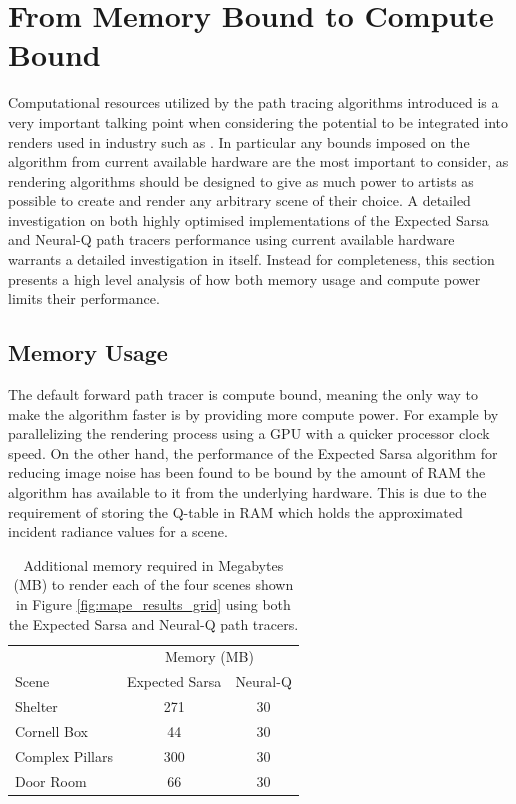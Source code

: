 \documentclass[../dissertation.tex]{subfiles}
\begin{document}
\section{From Memory Bound to Compute Bound}
\label{sec:mem_to_comp}

Computational resources utilized by the path tracing algorithms introduced is a very important talking point when considering the potential to be integrated into renders used in industry such as \cite{georgiev2018arnold, christensen2018renderman, hyperion}. In particular any bounds imposed on the algorithm from current available hardware are the most important to consider, as rendering algorithms should be designed to give as much power to artists as possible to create and render any arbitrary scene of their choice. A detailed investigation on both highly optimised implementations of the Expected Sarsa and Neural-Q path tracers performance using current available hardware warrants a detailed investigation in itself. Instead for completeness, this section presents a high level analysis of how both memory usage and compute power limits their performance.

\subsection{Memory Usage}

The default forward path tracer is compute bound, meaning the only way to make the algorithm faster is by providing more compute power. For example by parallelizing the rendering process using a GPU with a quicker processor clock speed. On the other hand, the performance of the Expected Sarsa algorithm for reducing image noise has been found to be bound by the amount of RAM the algorithm has available to it from the  underlying hardware. This is due to the requirement of storing the Q-table in RAM which holds the approximated incident radiance values for a scene.\\

\begin{table}[h]
	\centering
	\begin{tabular}{lcc}
		\toprule
		& \multicolumn{2}{c}{Memory (MB)} \\ \cmidrule(lr){2-3}
		Scene & Expected Sarsa & Neural-Q \\
		\midrule
		Shelter & 271 & 30 \\
		Cornell Box & 44 & 30 \\
		Complex Pillars & 300 & 30 \\
		Door Room & 66 & 30 \\
		\bottomrule
	\end{tabular}
	\caption{Additional memory required in Megabytes (MB) to render each of the four scenes shown in Figure \ref{fig:mape_results_grid} using both the Expected Sarsa and Neural-Q path tracers.}
	\label{tab:memory_usage}
\end{table}
\end{document}
